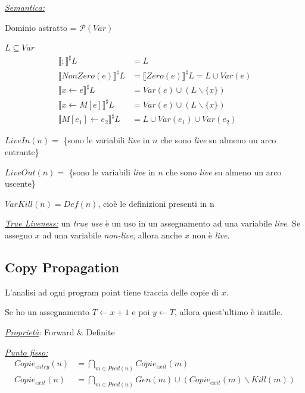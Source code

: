 \documentclass[a4paper, 10pt]{book}
\begin{document}
\noindent
\underline{\textit{Semantica:}}

Dominio astratto = $\mathcal{P}(Var)$

$L\subseteq Var$
\begin{align*}
	\llbracket ; \rrbracket^\sharp L &= L\\
	\llbracket NonZero(e) \rrbracket^\sharp L &= \llbracket Zero(e) \rrbracket^\sharp L = L \cup Var(e)\\
	\llbracket x\leftarrow e \rrbracket^\sharp L &= Var(e) \cup (L\backslash\{x\})\\
	\llbracket x\leftarrow M[e] \rrbracket^\sharp L &= Var(e) \cup (L\backslash\{x\})\\
	\llbracket M[e_1]\leftarrow e_2 \rrbracket^\sharp L &= L \cup Var(e_1) \cup Var(e_2)
\end{align*}

$LiveIn(n) = $ \{sono le variabili \textit{live} in $n$ che sono \textit{live} su almeno un arco entrante\}

$LiveOut(n) = $ \{sono le variabili \textit{live} in $n$ che sono \textit{live} su almeno un arco uscente\}

$VarKill(n) = Def(n)$, cioè le definizioni presenti in n
\newline

\noindent
\underline{\textit{True Liveness:}} un \textit{true use} è un uso in un assegnamento ad una variabile \textit{live}. Se assegno $x$ ad una variabile \textit{non-live}, allora anche $x$ non è \textit{live}.

\newpage
\subsection*{Copy Propagation}
L'analisi ad ogni program point tiene traccia delle copie di $x$.

\noindent
Se ho un assegnamento $T\leftarrow x+1$ e poi $y\leftarrow T$, allora quest'ultimo è inutile.
\newline

\noindent
\textit{\underline{Proprietà}}: Forward \& Definite
\newline

\noindent
\underline{\textit{Punto fisso:}}
\begin{align*}
	Copie_{entry}(n) &= \bigcap_{m\in Pred(n)} Copie_{exit}(m)\\
	Copie_{exit}(n) &= \bigcap_{m\in Pred(n)} Gen(m) \cup (Copie_{exit}(m)\backslash Kill(m))
\end{align*}
\end{document}
